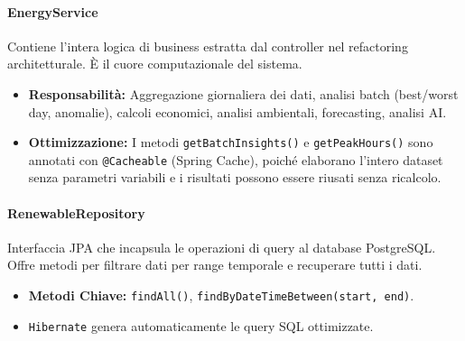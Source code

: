 \documentclass[a4paper,12pt]{report}
\begin{document}
\paragraph{EnergyService}
Contiene l'intera logica di business estratta dal controller nel refactoring architetturale. È il cuore computazionale del sistema.
\begin{itemize}
    \item \textbf{Responsabilità:} Aggregazione giornaliera dei dati, analisi batch (best/worst day, anomalie), calcoli economici, analisi ambientali, forecasting, analisi AI.
    \item \textbf{Ottimizzazione:} I metodi \texttt{getBatchInsights()} e \texttt{getPeakHours()} sono annotati con \texttt{@Cacheable} (Spring Cache), poiché elaborano l'intero dataset senza parametri variabili e i risultati possono essere riusati senza ricalcolo.
\end{itemize}

\paragraph{RenewableRepository}
Interfaccia JPA che incapsula le operazioni di query al database PostgreSQL. Offre metodi per filtrare dati per range temporale e recuperare tutti i dati.
\begin{itemize}
    \item \textbf{Metodi Chiave:} \texttt{findAll()}, \texttt{findByDateTimeBetween(start, end)}.
    \item \texttt{Hibernate} genera automaticamente le query SQL ottimizzate.
\end{itemize}
\end{document}
